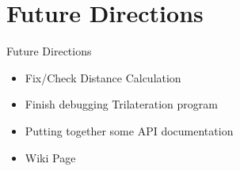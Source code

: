 \documentclass{beamer}
\begin{document}

\section{Future Directions}

\begin{frame}{Future Directions}{}
    \begin{itemize}
        \item Fix/Check Distance Calculation
        \item Finish debugging Trilateration program
        \item Putting together some API documentation
        \item Wiki Page
    \end{itemize}
\end{frame}
\end{document}
